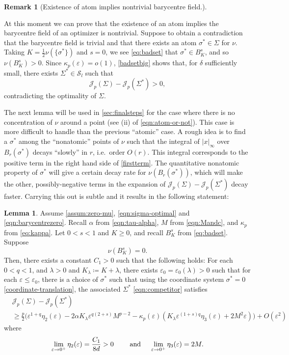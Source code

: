 \documentclass[preprint, reqno]{amsart}
\renewcommand{\epsilon}{\varepsilon}
\theoremstyle{definition}
\newtheorem{lemma}[definition]{Lemma}
\newtheorem{remark}[definition]{Remark}
\numberwithin{equation}{section}
\begin{document}
\begin{remark}[Existence of atom implies nontrivial barycentre
  field.]\label{rmk:atom-nontrivialbary}

  At this moment we can prove that the existence of an atom implies
  the barycentre field of an optimizer is nontrivial. Suppose to
  obtain a contradiction that the barycentre field is trivial and that
  there exists an atom $\sigma^* \in \Sigma$ for $\nu$. Taking $K =
  \frac{1}{2}\nu(\{\sigma^*\})$ and $s = 0$, we see \eqref{eq:badset}
  that $\sigma^* \in B_{K}^s$, and so $\nu(B_K^s) > 0$. Since
  $\kappa_p (\epsilon)= o({1})$, \cref{badsetbig} shows that, for
  $\delta$ sufficiently small, there exists $\Sigma^* \in
  \mathcal{S}_l$ such that
  \[
    \mathscr{J}_p(\Sigma) - \mathscr{J}_p(\Sigma^*) > 0,
  \]
  contradicting the optimality of $\Sigma$.
\end{remark}
The next lemma will be used in \cref{sec:finalsteps} for the case
where there is no concentration of $\nu$ around a point (see (ii) of
\eqref{eqn:atom-or-not}). This case is more difficult to handle than
the previous ``atomic'' case. A rough idea is to find a $\sigma^*$
among the ``nonatomic'' points of $\nu$ such that the integral of
$|x|_\infty$ over $B_r(\sigma^*)$ decays ``slowly'' in $r$, i.e.\
order $O(r)$. This integral corresponds to the positive term in the
right hand side of \eqref{firstterm}. The quantitative nonatomic
property of $\sigma^*$ will give a certain decay rate for
$\nu(B_r(\sigma^*))$, which will make the other, possibly-negative
terms in the expansion of $ \mathscr{J}_p(\Sigma) -
\mathscr{J}_p(\Sigma^*)$ decay faster. Carrying this out is subtle and
it results in the following statement:
\begin{lemma}\label{badsetnull}
  Assume \eqref{assum:zero-mu}, \eqref{eqn:sigma-optimal} and
  \eqref{eqn:barycentrezero}. Recall $\alpha$ from
  \eqref{eqn:tau-alpha}, $M$ from \eqref{eqn:Mandc}, and $\kappa_p$
  from \eqref{eq:kappa}. Let $0 < s < 1$ and $K \geq 0$, and recall
  $B_K^s$ from \eqref{eq:badset}. Suppose
  \[
    \nu(B_K^s) =0.
  \]
  Then, there exists a constant $C_1>0$ such that the following holds:
  For each $0 < q < 1$, and $\lambda > 0$ and $K_{\lambda} \coloneqq K
  + \lambda$, there exists $\epsilon_0=\epsilon_0(\lambda)>0$ such
  that for each $\epsilon \le \epsilon_0$, there is a choice of
  $\sigma^*$ such that using the coordinate system $\sigma^* = 0$
  \eqref{coordinate-translation}, the associated $\Sigma^*$
  \eqref{eqn:competitor} satisfies
  \begin{align}\label{eqn:zero-case-estimate}
    & \mathscr{J}_p(\Sigma) - \mathscr{J}_p(\Sigma^*) \\
    & \ge \frac{p}{2}\Big( \epsilon^{1+q} \eta_2(\epsilon) -{2
      \alpha}K_\lambda \epsilon^{q(2+s)} M^{p-2}  -
      \kappa_p(\epsilon)(K_{\lambda}\epsilon^{(1 + s)q}\eta_3(\epsilon)
      + 2 M^2 \epsilon) \Big) + O(\epsilon^2) \nonumber
  \end{align}
  where
  \begin{align*}
    \lim_{\epsilon\to 0^+} \eta_2(\epsilon)= \frac{C_1}{8d} > 0
    \qquad \hbox{ and } \quad \lim_{\epsilon\to 0^+}
    \eta_3(\epsilon)=2M.
  \end{align*}

\end{lemma}
\end{document}

